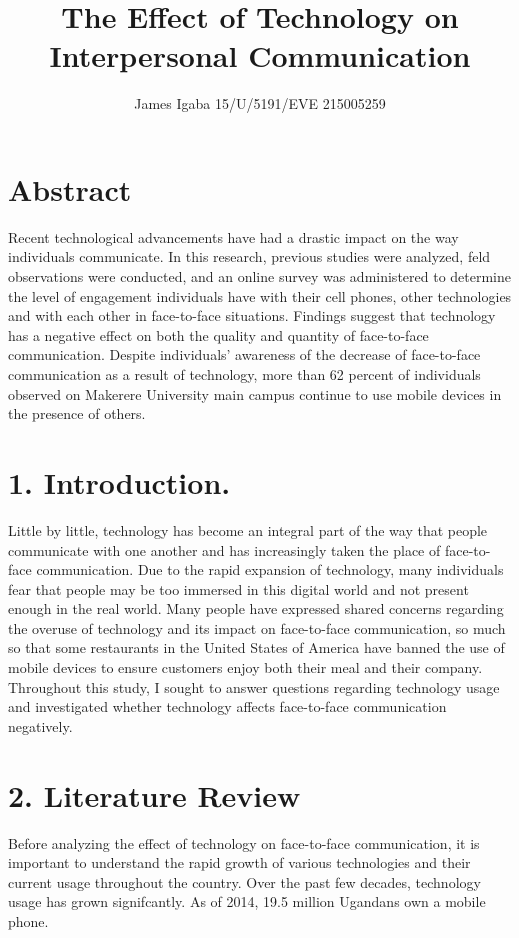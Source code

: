\documentclass[11pt]{article} %
\title{The Effect of Technology on Interpersonal Communication}
\author{James Igaba 15/U/5191/EVE 215005259}
\begin{document}
\maketitle

\section{Abstract }

Recent technological advancements have had a drastic impact on the way individuals communicate. In this research, previous studies were analyzed, feld observations were conducted, and an online survey was administered to determine the level of engagement individuals have with their cell phones, other technologies and with each other in face-to-face situations. Findings suggest that technology has a negative effect on both the quality and quantity of face-to-face communication. Despite individuals’ awareness of the decrease of face-to-face communication as a result of technology, more than 62 percent of individuals observed on Makerere University main campus continue to use mobile devices in the presence of others. 

\section{1. Introduction.}

Little by little, technology has become an integral part of the way that people communicate with one 
another and has increasingly taken the place of face-to-face communication. Due to the rapid expansion 
of technology, many individuals fear that people may be too immersed in this digital world and not present 
enough in the real world.
Many people have expressed shared concerns regarding the overuse of technology and its impact on face-to-face 
communication, so much so that some restaurants in the United States of America have banned the use of mobile devices to 
ensure customers enjoy both their meal and their company.
Throughout this study, I sought to answer questions regarding technology usage and investigated whether technology affects face-to-face communication negatively. 

\section{2. Literature Review}

Before analyzing the effect of technology on face-to-face communication, it is important to understand 
the rapid growth of various technologies and their current usage throughout the country. Over the past 
few decades, technology usage has grown signifcantly. As of 2014, 19.5 million Ugandans own a mobile phone.
\end{document}
